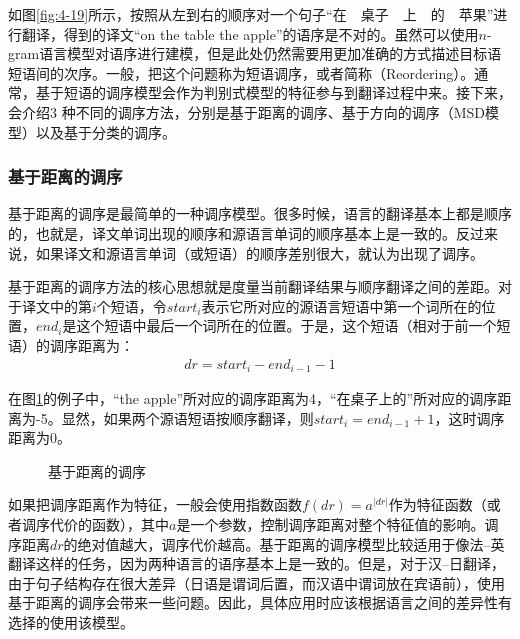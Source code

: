 \parinterval 如图\ref{fig:4-19}所示，按照从左到右的顺序对一个句子``在\ \ 桌子\ \ 上\ \ 的\ \ 苹果''进行翻译，得到的译文``on the table the apple''的语序是不对的。虽然可以使用$n$-gram语言模型对语序进行建模，但是此处仍然需要用更加准确的方式描述目标语短语间的次序。一般，把这个问题称为短语调序，或者简称{\small{}}（Reordering）。通常，基于短语的调序模型会作为判别式模型的特征参与到翻译过程中来。接下来，会介绍3 种不同的调序方法，分别是基于距离的调序、基于方向的调序（MSD模型）以及基于分类的调序。


\subsubsection{基于距离的调序}

\parinterval 基于距离的调序是最简单的一种调序模型。很多时候，语言的翻译基本上都是顺序的，也就是，译文单词出现的顺序和源语言单词的顺序基本上是一致的。反过来说，如果译文和源语言单词（或短语）的顺序差别很大，就认为出现了调序。

\parinterval 基于距离的调序方法的核心思想就是度量当前翻译结果与顺序翻译之间的差距。对于译文中的第$i$个短语，令$start_i$表示它所对应的源语言短语中第一个词所在的位置，$end_i$是这个短语中最后一个词所在的位置。于是，这个短语（相对于前一个短语）的调序距离为：
\begin{eqnarray}
dr = start_i-end_{i-1}-1
\label{eq:4-15}
\end{eqnarray}

\parinterval 在图\ref{fig:4-20}的例子中，``the apple''所对应的调序距离为4，``在桌子上的''所对应的调序距离为-5。显然，如果两个源语短语按顺序翻译，则$start_i = end_{i-1} + 1$，这时调序距离为0。

\begin{figure}[htp]
\centering

\caption{基于距离的调序}
\label{fig:4-20}
\end{figure}

\parinterval 如果把调序距离作为特征，一般会使用指数函数$f(dr) = a^{|dr|}$作为特征函数（或者调序代价的函数），其中$a$是一个参数，控制调序距离对整个特征值的影响。调序距离$dr$的绝对值越大，调序代价越高。基于距离的调序模型比较适用于像法–英翻译这样的任务，因为两种语言的语序基本上是一致的。但是，对于汉–日翻译，由于句子结构存在很大差异（日语是谓词后置，而汉语中谓词放在宾语前），使用基于距离的调序会带来一些问题。因此，具体应用时应该根据语言之间的差异性有选择的使用该模型。

